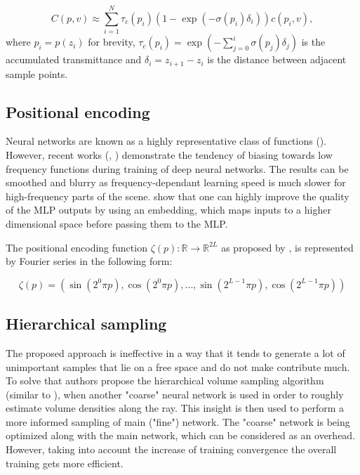 \begin{equation}
    \label{eq:integral_estimation}
    C(p, v) \approx \sum_{i=1}^{N} \tau_c(p_i) (1 - \exp (-\sigma(p_i) \delta_i)) c(p_i, v),
\end{equation}
where $p_i = p(z_i)$ for brevity, $\tau_c(p_i) = \exp (-\sum_{j=0}^i \sigma(p_j) \delta_j )$ is the accumulated transmittance and $\delta_i = z_{i+1} - z_i$ is the distance between adjacent sample points.

\subsection{Positional encoding}
\label{subsec:pos_enc}

Neural networks are known as a highly representative class of functions (\cite{hornik1989multilayer}).
However, recent works (\cite{rahaman2019spectral}, \cite{tancik2020fourfeat}) demonstrate the tendency of
biasing towards low frequency functions during training of deep neural networks.
The results can be smoothed and blurry as frequency-dependant learning speed
is much slower for high-frequency parts of the scene.
\cite{rahaman2019spectral} show that one can highly improve the quality of the MLP outputs
by using an embedding, which maps inputs to a higher dimensional space before passing them to the MLP.

The positional encoding function $\zeta(p) : \mathbb{R} \xrightarrow{} \mathbb{R}^{2L}$ as proposed by \cite{mildenhall2020nerf}, \cite{vaswani2017attention} is represented by Fourier series in the following form:

\begin{equation}
    \label{eq:positional_encoding}
    \zeta(p) = (\sin(2^0\pi p), \cos(2^0\pi p), ..., \sin(2^{L-1}\pi p), \cos(2^{L-1}\pi p))
\end{equation}


\subsection{Hierarchical sampling}
\label{subsec:hierarchy_sampling}

The proposed approach is ineffective in a way that it tends to generate a lot of unimportant samples
that lie on a free space and do not make contribute much.
To solve that authors propose the hierarchical volume sampling algorithm (similar to \cite{levoy1990efficient}),
when another "coarse" neural network is used in order to roughly estimate volume densities along the ray.
This insight is then used to perform a more informed sampling of main ("fine") network.
The "coarse" network is being optimized along with the main network, which can be considered as an overhead.
However, taking into account the increase of training convergence the overall training gets more efficient.


